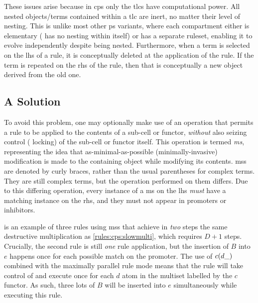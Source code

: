 These issues arise because in \gls{cps} only the \glspl{tlc} have computational power.  All nested objects/terms contained within a \gls{tlc} are inert, no matter their level of nesting.  This is unlike most other \gls{ps} variants, where each \gls{compartment} either is elementary (\ie{} has no nesting within itself) or has a separate ruleset, enabling it to evolve independently despite being nested.  Furthermore, when a term is selected on the \gls{lhs} of a rule, it is conceptually deleted at the application of the rule.  If the term is repeated on the \gls{rhs} of the rule, then that is conceptually a new object derived from the old one.

\subsection{A Solution}
To avoid this problem, one may optionally make use of an operation that permits a rule to be applied to the contents of a sub-cell or functor, \emph{without} also seizing control (\ie{} locking) of the sub-cell or functor itself.  This operation is termed \emph{\gls{ms}}, representing the idea that as-minimal-as-possible (minimally-invasive) modification is made to the containing object while modifying its contents.  \Glspl{ms} are denoted by curly braces, rather than the usual parentheses for complex terms.  They are still complex terms, but the operation performed on them differs.  Due to this differing operation, every instance of a \gls{ms} on the \gls{lhs} \emph{must} have a matching instance on the \gls{rhs}, and they must not appear in \glspl{promoter} or \glspl{inhibitor}.

\begin{cprulesetfloat}
    \begin{cpruleset}

    \end{cpruleset}
    \caption{\label{rules:cps:microsurg}Rules for a destructive multiplication process that requires exactly two steps regardless of the numbers multiplied by using \gls{cps} \glspl{ms}}
\end{cprulesetfloat}

 is an example of three rules using \glspl{ms} that achieve in \emph{two} steps the same destructive multiplication as \cref{rules:cps:slowmulti}, which requires \(D + 1\) steps.  Crucially, the second rule is still \emph{one} rule application, but the insertion of \(B\) into \(e\) happens once for each possible match on the \gls{promoter}.  The use of \(c(d\_)\) combined with the maximally parallel rule mode means that the rule will take control of and execute once for each \(d\) atom in the multiset labelled by the \(c\) functor.  As such, three lots of \(B\) will be inserted into \(e\) simultaneously while executing this rule.

